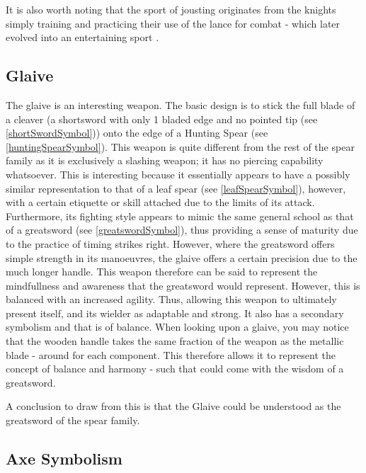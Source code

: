 \documentclass{article}
\begin{document}
It is also worth noting that the sport of jousting originates from the knights simply training and practicing their use of the lance for combat - which later evolved into an entertaining sport \parencite{smith2017lance}. 

\subsection*{Glaive}
The glaive is an interesting weapon. The basic design is to stick the full blade of a cleaver (a shortsword with only 1 bladed edge and no pointed tip (see \ref{shortSwordSymbol})) onto the edge of a Hunting Spear (see \ref{huntingSpearSymbol}). This weapon is quite different from the rest of the spear family as it is exclusively a slashing weapon; it has no piercing capability whatsoever. This is interesting because it essentially appears to have a possibly similar representation to that of a leaf spear (see \ref{leafSpearSymbol}), however, with a certain etiquette or skill attached due to the limits of its attack. Furthermore, its fighting style appears to mimic the same general school as that of a greatsword (see \ref{greatswordSymbol}), thus providing a sense of maturity due to the practice of timing strikes right. However, where the greatsword offers simple strength in its manoeuvres, the glaive offers a certain precision due to the much longer handle. This weapon therefore can be said to represent the mindfullness and awareness that the greatsword would represent. However, this is balanced with an increased agility. Thus, allowing this weapon to ultimately present itself, and its wielder as adaptable and strong. It also has a secondary symbolism and that is of balance. When looking upon a glaive, you may notice that the wooden handle takes the same fraction of the weapon as the metallic blade - around  for each component. This therefore allows it to represent the concept of balance and harmony - such that could come with the wisdom of a greatsword.

A conclusion to draw from this is that the Glaive could be understood as the greatsword of the spear family.

\subsection{Axe Symbolism} \label{axeSymbol}
\pagebreak


\printbibliography
\end{document}

